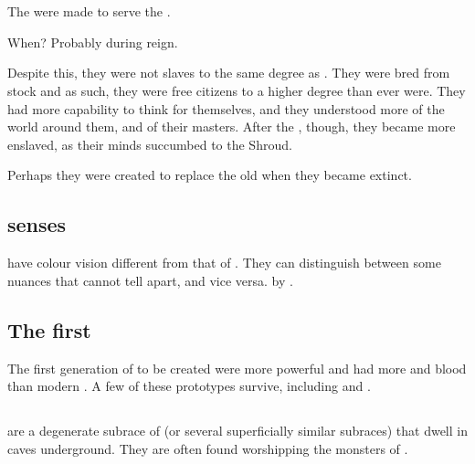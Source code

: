 \section{\Scathae}
The \scathae{} were made to serve the \dragons. 

When? Probably during \Tiamatz{} reign. 

Despite this, they were not slaves to the same degree as \humans. They were bred from \naga{} stock and as such, they were free citizens to a higher degree than \humans{} ever were. They had more capability to think for themselves, and they understood more of the world around them, and of their masters. After the , though, they became more enslaved, as their minds succumbed to the Shroud.

Perhaps they were created to replace the old  when they became extinct. 









\subsection{\Scathaese{} senses}
\label{Scathaese colour vision}
\Scathae{} have colour vision different from that of \humans. They can distinguish between some nuances that \humans{} cannot tell apart, and vice versa.  by .









\subsection{The first \scathae}
The first generation of \scathae{} to be created were more powerful and had more \draconian{} and \xsic{} blood than modern \scathae. A few of these prototypes survive, including  and \hs{\PsyrexFull}. 









\subsection{\Troglodytes}
\label{\troglodytes}
\Troglodytes{} are a degenerate subrace of \scathae{} (or several superficially similar subraces) that dwell in caves underground. They are often found worshipping the \daemonic{} monsters of . 

